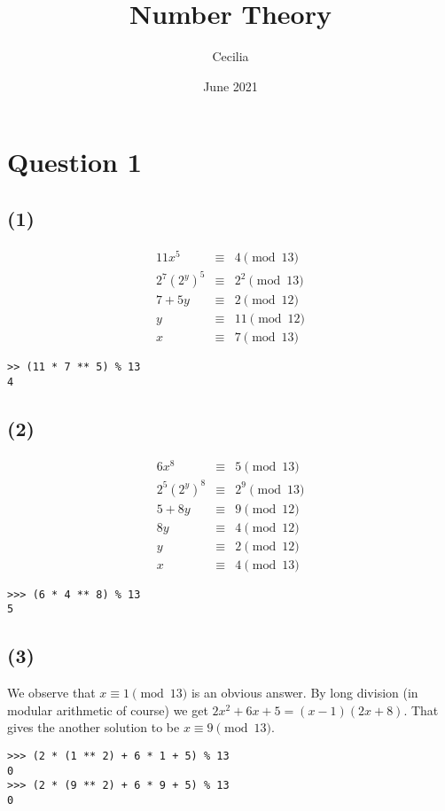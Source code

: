\documentclass{article}
\title{Number Theory}
\author{Cecilia}
\date{June 2021}
\begin{document}


\maketitle
\section*{Question 1}
\subsection*{(1)}
\begin{eqnarray*}
        11x^5 & \equiv & 4   \pmod{13} \\
  2^7 (2^y)^5 & \equiv & 2^2 \pmod{13} \\
       7 + 5y & \equiv & 2   \pmod{12} \\
            y & \equiv & 11  \pmod{12} \\
            x & \equiv & 7   \pmod{13}
\end{eqnarray*}
\begin{verbatim}
>> (11 * 7 ** 5) % 13
4
\end{verbatim}

\subsection*{(2)}
\begin{eqnarray*}
         6x^8 & \equiv & 5   \pmod{13} \\
  2^5 (2^y)^8 & \equiv & 2^9 \pmod{13} \\
       5 + 8y & \equiv & 9   \pmod{12} \\
           8y & \equiv & 4   \pmod{12} \\
            y & \equiv & 2   \pmod{12} \\
            x & \equiv & 4   \pmod{13}
\end{eqnarray*}
\begin{verbatim}
>>> (6 * 4 ** 8) % 13
5
\end{verbatim}

\subsection*{(3)}
We observe that $ x \equiv 1 \pmod{13} $ is an obvious answer. By long division (in modular arithmetic of course) we get $ 2x^2 + 6x + 5 = (x - 1)(2x + 8) $. That gives the another solution to be $ x \equiv 9 \pmod{13} $.
\begin{verbatim}
>>> (2 * (1 ** 2) + 6 * 1 + 5) % 13
0
>>> (2 * (9 ** 2) + 6 * 9 + 5) % 13
0
\end{verbatim}
\end{document}
